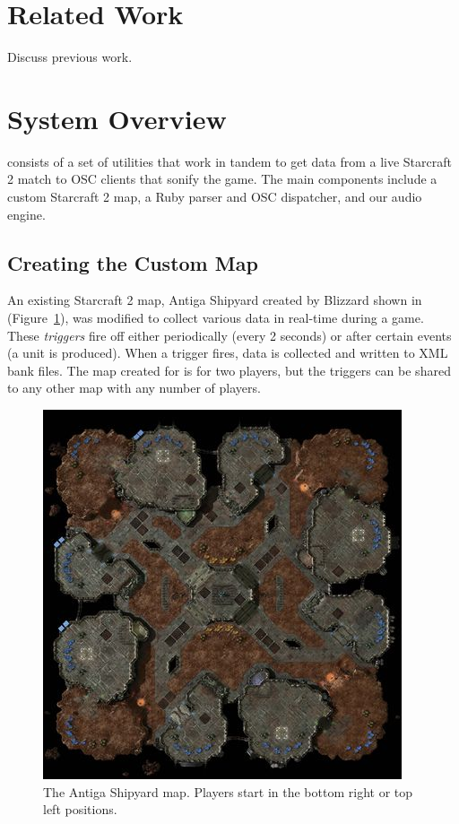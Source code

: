 \documentclass{nime-document-class}
\begin{document}
\section{Related Work}
Discuss previous work.

\section{System Overview}
\projectName{} consists of a set of utilities that work in tandem to get data from a live Starcraft 2 match to OSC clients that sonify the game.
The main components include a custom Starcraft 2 map, a Ruby parser and OSC dispatcher, and our audio engine.

\subsection{Creating the Custom Map}
An existing Starcraft 2 map, Antiga Shipyard created by Blizzard shown in (Figure~\ref{fig:AntigaShipyardFigure}), was modified to collect various data in real-time during a game.
These {\em triggers} fire off either periodically (every 2 seconds) or after certain events (a unit is produced). When a trigger fires, data is collected and written to XML bank files.
The map created for \projectName{} is for two players, but the triggers can be shared to any other map with any number of players. 

\begin{figure}[htbp]
	\centering
		\includegraphics[width=1\columnwidth]{antiga-shipyard}
	\caption{The Antiga Shipyard map. Players start in the bottom right or top left positions.}
	\label{fig:AntigaShipyardFigure}
\end{figure}
\end{document}
